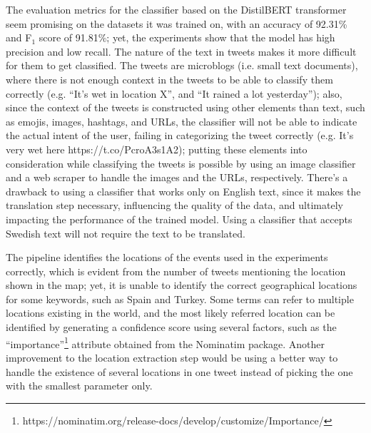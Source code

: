 The evaluation metrics for the classifier based on the DistilBERT transformer seem promising on the
datasets it was trained on, with an accuracy of 92.31\% and F$_{1}$ score of 91.81\%; yet, the
experiments show that the model has high precision and low recall. The nature of the text in tweets
makes it more difficult for them to get classified. The tweets are
microblogs (i.e. small text documents), where there is not enough context in the tweets to be able
to classify them correctly (e.g. ``It's wet in location X'', and ``It rained a lot yesterday'');
also, since the context of the tweets is constructed using other elements than text, such as emojis,
images, hashtags, and \ac{URL}s, the classifier will not be able to indicate the actual intent of
the user, failing in categorizing the tweet correctly (e.g. It's very wet here
https://t.co/PcroA3s1A2); putting these elements into consideration while classifying the tweets is
possible by using an image classifier and a web scraper to handle the images and the \ac{URL}s,
respectively. There's a drawback to using a classifier that works only on English text, since it
makes the translation step necessary, influencing the quality of the data, and ultimately impacting
the performance of the trained model. Using a classifier that accepts Swedish text will not require
the text to be translated.

The pipeline identifies the locations of the events used in the experiments correctly, which is
evident from the number of tweets mentioning the location shown in the map; yet, it is unable to
identify the correct geographical locations for some keywords, such as Spain and Turkey. Some terms
can refer to multiple locations existing in the world, and the most likely referred location can be
identified by generating a confidence score using several factors, such as the
``importance''\footnote{https://nominatim.org/release-docs/develop/customize/Importance/} attribute
obtained from the Nominatim package. Another improvement to the location extraction step would be
using a better way to handle the existence of several locations in one tweet instead of picking the
one with the smallest parameter only.

